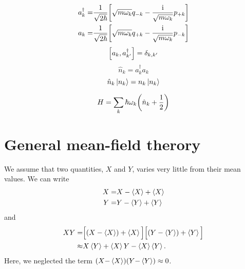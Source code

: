\documentclass[11pt,letter, swedish, english, twocolumn
]{article}
\begin{document}
\begin{equation}
\begin{aligned}
a_k^\dagger =& \frac{1}{\sqrt{2\hbar}}
\qty[\sqrt{m\omega_k}q_{-k} - \frac{\mathrm{i}}{\sqrt{m\omega_k}}p_{+k}]\\
a_k =& \frac{1}{\sqrt{2\hbar}}
\qty[\sqrt{m\omega_k}q_{+k} - \frac{\mathrm{i}}{\sqrt{m\omega_k}}p_{-k}]\\
\end{aligned}
\end{equation}
\begin{equation}
\comm{a_k}{a_{k'}^\dagger}=\delta_{k,k'}
\end{equation}
\begin{equation}
\hat{n}_k=a_k^\dagger a_k
\end{equation}
\begin{equation}
\hat{n}_k\ket{n_k}=n_k\ket{n_k}
\end{equation}

\begin{equation}
H=\sum_k \hbar\omega_k\qty(\hat{n}_k+\frac{1}{2})
\end{equation}


\section{General mean-field therory}
We assume that two quantities, $X$ and $Y$, varies very little from
their mean values. We can write
\begin{equation}
\begin{aligned}
X=&X-\ev{X}+\ev{X}\\
Y=&Y-\ev{Y}+\ev{Y}
\end{aligned}
\end{equation}
and
\begin{equation}
\begin{aligned}
XY=&\Big[(X-\ev{X})+\ev{X}\Big]
\Big[(Y-\ev{Y})+\ev{Y}\Big]
\\\approx&
X\ev{Y}+\ev{X}Y-\ev{X}\ev{Y}.
\end{aligned}
\end{equation}
Here, we neglected the term $(X{-}\ev{X})(Y{-}\ev{Y})\approx0$. 
\end{document}
